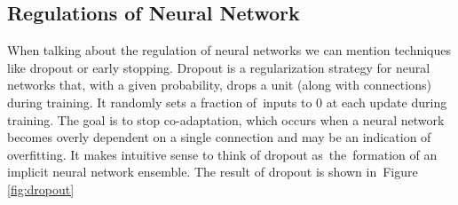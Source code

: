 \subsection{Regulations of Neural Network}
When talking about the regulation of neural networks we can mention techniques like dropout or early stopping.\newline
Dropout is a regularization strategy for neural networks that, with a given probability, drops a unit (along with connections) during training. It randomly sets a fraction of~inputs to 0 at each update during training.
The goal is to stop co-adaptation, which occurs when a neural network becomes overly dependent on a single connection and may be an indication of overfitting. It makes intuitive sense to think of dropout as~the~formation of an implicit neural network ensemble. The result of dropout is shown in~Figure \ref{fig:dropout}
\def\layersep{2}
\def\nodesep{1.5}
